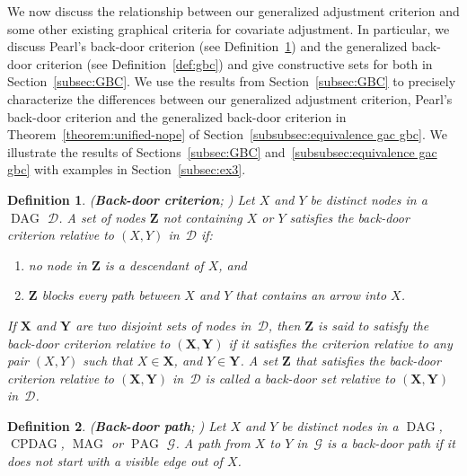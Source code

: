 \documentclass[11pt,a4paper]{article}
\newtheorem{definition}{Definition}
\DeclareMathOperator{\CPDAG}{CPDAG}
\DeclareMathOperator{\DAG}{DAG}
\DeclareMathOperator{\MAG}{MAG}
\DeclareMathOperator{\PAG}{PAG}
\newcommand{\g}[1][G]{\mathcal{#1}}
\begin{document}
We now discuss the relationship between our generalized adjustment criterion and some other existing graphical criteria for covariate adjustment.
In particular, we discuss  Pearl's back-door criterion (see Definition~\ref{def:bc}) and the generalized back-door criterion (see Definition~\ref{def:gbc}) and give constructive sets for both in Section~\ref{subsec:GBC}.
We use the results from Section~\ref{subsec:GBC} to precisely characterize the differences between our generalized adjustment criterion, Pearl's back-door criterion and the generalized back-door criterion in Theorem~\ref{theorem:unified-nope} of Section~\ref{subsubsec:equivalence gac gbc}.
We illustrate the results of Sections~\ref{subsec:GBC} and~\ref{subsubsec:equivalence gac gbc} with examples in Section~\ref{subsec:ex3}.
\begin{definition} (\textbf{Back-door criterion}; \citealp{pearl1993bayesian})
 Let $X$ and $Y$ be distinct nodes in a $\DAG$ $\g[D]$. A set of nodes $\mathbf{Z}$ not containing $X$ or $Y$ satisfies the back-door criterion relative to $(X,Y)$ in~$\g[D]$ if:
\begin{enumerate}[label=(\roman*)]
\item\label{d:bc1} no node in $\mathbf{Z}$ is a descendant of $X$, and
\item\label{d:bc2} $\mathbf{Z}$ blocks every path between $X$ and $Y$ that contains an arrow into $X$.
\end{enumerate}
If $\mathbf{X}$ and $\mathbf{Y}$ are two disjoint sets of nodes in~$\g[D]$, then $\mathbf{Z}$ is said to satisfy the back-door criterion relative to $(\mathbf{X,Y})$ if it satisfies the criterion relative to any pair $(X,Y)$ such that $X \in \mathbf{X}$, and $Y \in \mathbf{Y}$.
A set $\mathbf{Z}$ that satisfies the back-door criterion relative to $(\mathbf{X,Y})$ in~$\g[D]$ is called a back-door set relative to $(\mathbf{X,Y})$ in~$\g[D]$.
\label{def:bc}
\end{definition}
\begin{definition}{(\textbf{Back-door path}; \citealp{maathuis2013generalized})}
Let $X$ and $Y$ be distinct nodes in a $\DAG$, $\CPDAG$, $\MAG$ or $\PAG$ $\g$. A path from $X$ to $Y$ in~$\g$ is a back-door path if it does not start with a visible edge out of $X$.
\label{def:backdoor path}
\end{definition}
\end{document}
